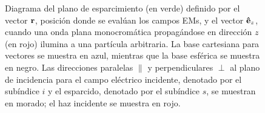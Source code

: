 \begin{figure}[h!]
%
\caption{Diagrama del plano de esparcimiento (en verde) definido por el vector $\vb{r}$, posición donde se evalúan los campos EMs, y el vector $\vu{e}_z$, cuando una onda plana monocromática propagándose en dirección $z$ (en rojo) ilumina a una partícula arbitraria.  La base cartesiana para vectores se muestra en azul, mientras que la base esférica se muestra en negro.  Las direcciones paralelas $\parallel$ y perpendiculares $\perp$ al plano de incidencia  para el campo eléctrico incidente, denotado por el subíndice $i$ y el esparcido, denotado por el subíndice $s$, se muestran en morado; el haz incidente se muestra en rojo.}\label{fig:PlanoEsparcimiento}
	\end{figure}	

